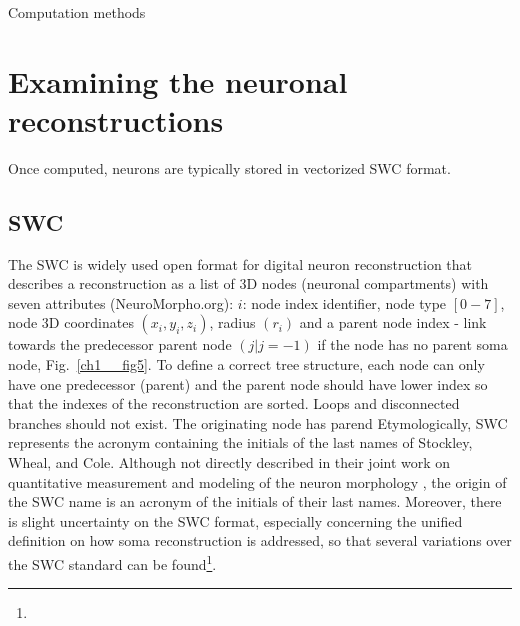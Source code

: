 Computation methods

\section{Examining the neuronal reconstructions}
Once computed, neurons are typically stored in vectorized SWC format. 
\subsection{SWC} 
%
The SWC \cite{cannon1998line} is widely used open format for digital neuron reconstruction that describes a reconstruction as a list of 3D nodes (neuronal compartments) with seven attributes (NeuroMorpho.org):  $i$: node index identifier, node type $[0-7]$, node 3D coordinates $(x_i,y_i,z_i)$, radius $(r_i)$ and a parent node index - link towards the predecessor parent node $(j | j=-1)$ if the node has no parent soma node, Fig.~\ref{ch1__fig5}. To define a correct tree structure, each node can only have one predecessor (parent) and the parent node should have lower index so that the indexes of the reconstruction are sorted. Loops and disconnected branches should not exist. The originating node has parend  Etymologically, SWC represents the acronym containing the initials of the last names of Stockley, Wheal, and Cole. Although not directly described in their joint work on quantitative measurement and modeling of the neuron morphology \cite{stockley1993system}, the origin of the SWC name is an acronym of the initials of their last names. Moreover, there is slight uncertainty on the SWC format, especially concerning the unified definition on how soma reconstruction is addressed, so that several variations over the SWC standard can be found\footnote{}.
